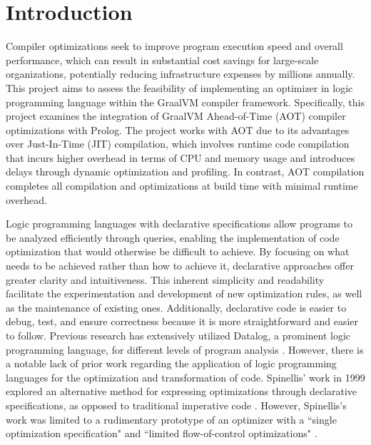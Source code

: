\chapter[Introduction]{Introduction}

Compiler optimizations seek to improve program execution speed and overall performance, which can result in substantial cost savings for large-scale organizations, potentially reducing infrastructure expenses by millions annually. This project aims to assess the feasibility of implementing an optimizer in logic programming language within the GraalVM compiler framework. Specifically, this project examines the integration of GraalVM Ahead-of-Time (AOT) compiler optimizations with Prolog. The project works with AOT due to its advantages over Just-In-Time (JIT) compilation, which involves runtime code compilation that incurs higher overhead in terms of CPU and memory usage and introduces delays through dynamic optimization and profiling. In contrast, AOT compilation completes all compilation and optimizations at build time with minimal runtime overhead. 

Logic programming languages with declarative specifications allow programs to be analyzed efficiently through queries, enabling the implementation of code optimization that would otherwise be difficult to achieve. By focusing on what needs to be achieved rather than how to achieve it, declarative approaches offer greater clarity and intuitiveness. This inherent simplicity and readability facilitate the experimentation and development of new optimization rules, as well as the maintenance of existing ones. Additionally, declarative code is easier to debug, test, and ensure correctness because it is more straightforward and easier to follow. Previous research has extensively utilized Datalog, a prominent logic programming language, for different levels of program analysis \cite{Bravenboer2009,Tonder2021,Lam2005,Benton2007}. However, there is a notable lack of prior work regarding the application of logic programming languages for the optimization and transformation of code. Spinellis’ work in 1999 explored an alternative method for expressing optimizations through declarative specifications, as opposed to traditional imperative code \cite{Spinellis1999}. However, Spinellis’s work was limited to a rudimentary prototype of an optimizer with a ``single optimization specification" and ``limited flow-of-control optimizations" \cite{Spinellis1999}.

